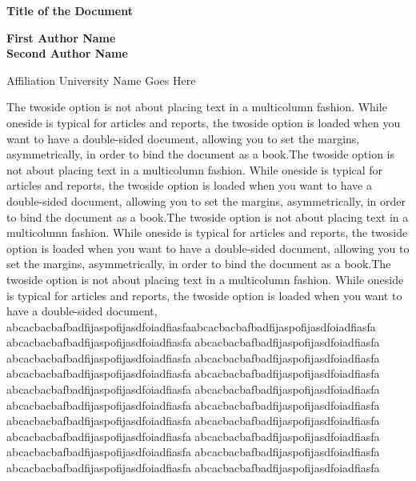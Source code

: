 \documentclass{article}  %
\begin{document}

\begin{center}
    \textbf{\LARGE Title of the Document}
\end{center}

\begin{center}
    \textbf{\large First Author Name} \\
    \textbf{\large Second Author Name} \\
\end{center}

\begin{center}
    Affiliation University Name Goes Here \\
\end{center}

\begin{twocolumn}
The twoside option is not about placing text in a multicolumn fashion. 
While oneside is typical for articles and reports, 
the twoside option is loaded when you want to have a double-sided document, 
allowing you to set the margins, asymmetrically, in order to bind the document as a book.The twoside option is not about placing text in a multicolumn fashion. 
While oneside is typical for articles and reports, 
the twoside option is loaded when you want to have a double-sided document, 
allowing you to set the margins, asymmetrically, in order to bind the document as a book.The twoside option is not about placing text in a multicolumn fashion. 
While oneside is typical for articles and reports, 
the twoside option is loaded when you want to have a double-sided document, 
allowing you to set the margins, asymmetrically, in order to bind the document as a book.The twoside option is not about placing text in a multicolumn fashion. 
While oneside is typical for articles and reports, 
the twoside option is loaded when you want to have a double-sided document, 
abcacbacbafbadfijaspofijasdfoiadfiasfaabcacbacbafbadfijaspofijasdfoiadfiasfa
abcacbacbafbadfijaspofijasdfoiadfiasfa
abcacbacbafbadfijaspofijasdfoiadfiasfa
abcacbacbafbadfijaspofijasdfoiadfiasfa
abcacbacbafbadfijaspofijasdfoiadfiasfa
abcacbacbafbadfijaspofijasdfoiadfiasfa
abcacbacbafbadfijaspofijasdfoiadfiasfa
abcacbacbafbadfijaspofijasdfoiadfiasfa
abcacbacbafbadfijaspofijasdfoiadfiasfa
abcacbacbafbadfijaspofijasdfoiadfiasfa
abcacbacbafbadfijaspofijasdfoiadfiasfa
abcacbacbafbadfijaspofijasdfoiadfiasfa
abcacbacbafbadfijaspofijasdfoiadfiasfa
abcacbacbafbadfijaspofijasdfoiadfiasfa
abcacbacbafbadfijaspofijasdfoiadfiasfa
abcacbacbafbadfijaspofijasdfoiadfiasfa
abcacbacbafbadfijaspofijasdfoiadfiasfa
abcacbacbafbadfijaspofijasdfoiadfiasfa
abcacbacbafbadfijaspofijasdfoiadfiasfa

\end{twocolumn}
\end{document}
